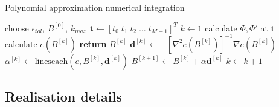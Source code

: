 \documentclass{article}
\begin{document}
    \begin{algorithm}
        \caption{Polynomial approximation numerical integration}
        \begin{algorithmic}
            \State choose $\epsilon_{tol}$, $B^{[0]}$, $k_{max}$
            \State $\pmb{t} \gets [t_0 \; t_1 \; t_2 \; \dots \; t_{M-1} ]^T$
            \State $k \gets 1$
            \State calculate $\Phi, \Phi'$ at $\pmb{t}$
            \Repeat
                \State calculate $e(B^{[k]})$
                    \State \textbf{return} $B^{[k]}$
                \EndIf
                \State $ \pmb{d}^{[k]} \gets -\left[ \nabla^2 e(B^{[k]}) \right]^{-1} \nabla e(B^{[k]})$
                \State $ \alpha^{[k]} \gets \text{lineseach}(e, B^{[k]}, \pmb{d}^{[k]}) $
                \State $ B^{[k+1]} \gets B^{[k]} + \alpha \pmb{d}^{[k]}$
                \State $k \gets k+1$
            \label{alg:intapprox}
        \end{algorithmic}
    \end{algorithm}

    \subsection{Realisation details}
\end{document}
